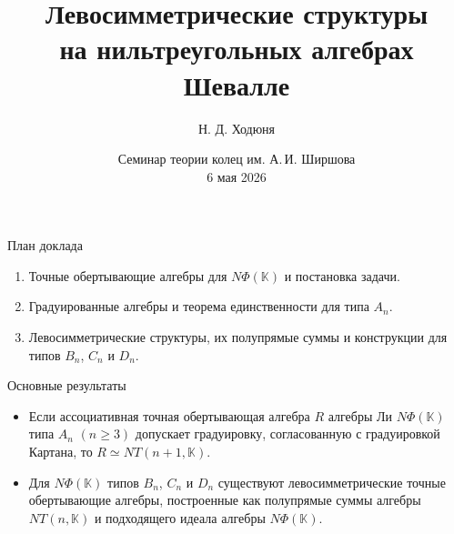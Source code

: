 \documentclass[12pt,aspectratio=169]{beamer}
\title[Левосимметрические структуры на $N\Phi(\K)$]{Левосимметрические структуры\\ на нильтреугольных алгебрах Шевалле}
\author[Н. Д. Ходюня]{Н. Д. Ходюня}
\institute[СФУ]{Сибирский Федеральный Университет}
\date[06.05.2026]{Семинар теории колец им. А.\,И. Ширшова\\6 мая 2026}
\newcommand{\K}{\mathbb{K}}
\begin{document}
\begin{frame}[plain]
    \vfill
    \begin{center}
        {\inserttitle\par}
        \vspace{1.6em}
        {\insertauthor\par}
        \vspace{0.4em}
        {\insertinstitute\par}
    \end{center}
    \vfill
    \begin{center}
        {\insertdate\par}
    \end{center}
\end{frame}

\begin{frame}[t]{План доклада}
    \begin{enumerate}
        \item Точные обертывающие алгебры для $N\Phi(\K)$ и постановка задачи.
        \item Градуированные алгебры и теорема единственности для типа $A_n$.
        \item Левосимметрические структуры, их полупрямые суммы и конструкции для типов
              $B_n$, $C_n$ и $D_n$.
    \end{enumerate}

    \medskip

    \begin{alertblock}{Основные результаты}
        \begin{itemize}
            \item Если ассоциативная точная обертывающая алгебра $R$ алгебры Ли $N\Phi(\K)$ типа
                  $A_n$ $(n\ge 3)$ допускает градуировку, согласованную с градуировкой Картана,
                  то $R \simeq NT(n+1,\K)$.

            \item Для $N\Phi(\K)$ типов $B_n$, $C_n$ и $D_n$ существуют левосимметрические точные
                  обертывающие алгебры, построенные как полупрямые суммы алгебры
                  $NT(n,\mathbb{K})$ и подходящего идеала алгебры $N\Phi(\mathbb{K})$.
        \end{itemize}
    \end{alertblock}
\end{frame}
\end{document}
